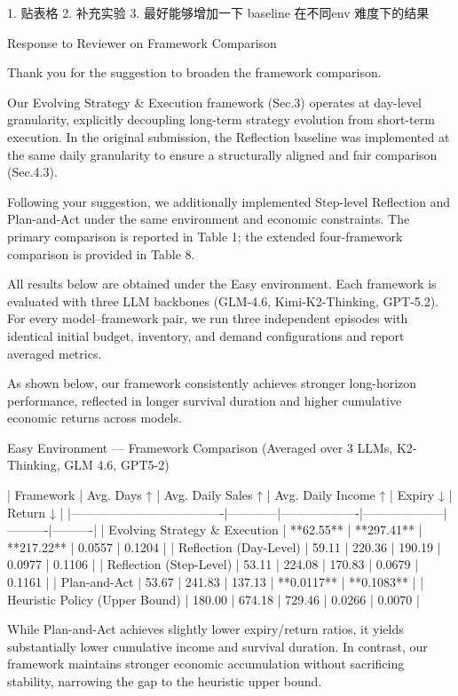 1. 贴表格
2. 补充实验
3. 最好能够增加一下 baseline 在不同env 难度下的结果


Response to Reviewer on Framework Comparison

Thank you for the suggestion to broaden the framework comparison.

Our Evolving Strategy & Execution framework (Sec.3) operates at day-level granularity, explicitly decoupling long-term strategy evolution from short-term execution. In the original submission, the Reflection baseline was implemented at the same daily granularity to ensure a structurally aligned and fair comparison (Sec.4.3).

Following your suggestion, we additionally implemented Step-level Reflection and Plan-and-Act under the same environment and economic constraints. The primary comparison is reported in Table 1; the extended four-framework comparison is provided in Table 8.

All results below are obtained under the Easy environment. Each framework is evaluated with three LLM backbones (GLM-4.6, Kimi-K2-Thinking, GPT-5.2). For every model–framework pair, we run three independent episodes with identical initial budget, inventory, and demand configurations and report averaged metrics.

As shown below, our framework consistently achieves stronger long-horizon performance, reflected in longer survival duration and higher cumulative economic returns across models.

Easy Environment — Framework Comparison (Averaged over 3 LLMs, K2-Thinking, GLM 4.6, GPT5-2)

| Framework                          | Avg. Days ↑ | Avg. Daily Sales ↑ | Avg. Daily Income ↑ | Expiry ↓ | Return ↓ |
|-------------------------------------|------------|-------------------|--------------------|----------|----------|
| Evolving Strategy & Execution       | **62.55**  | **297.41**        | **217.22**         | 0.0557   | 0.1204   |
| Reflection (Day-Level)              | 59.11      | 220.36            | 190.19             | 0.0977   | 0.1106   |
| Reflection (Step-Level)             | 53.11      | 224.08            | 170.83             | 0.0679   | 0.1161   |
| Plan-and-Act                        | 53.67      | 241.83            | 137.13             | **0.0117** | **0.1083** |
| Heuristic Policy (Upper Bound)      | 180.00     | 674.18            | 729.46             | 0.0266   | 0.0070   |

While Plan-and-Act achieves slightly lower expiry/return ratios, it yields substantially lower cumulative income and survival duration. In contrast, our framework maintains stronger economic accumulation without sacrificing stability, narrowing the gap to the heuristic upper bound.


